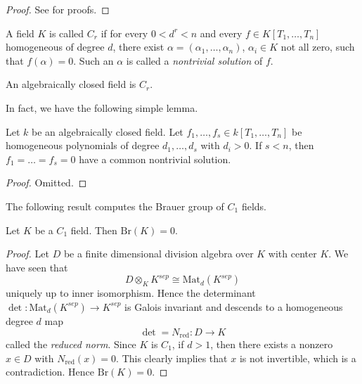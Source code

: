 \begin{proof}
See \cite{SerreGaloisCohomology} for proofs.
\end{proof}


\begin{definition}
\label{definition-Cr}
A field $K$ is called {\it $C_r$}
if for every $0 < d^r < n$ and every $f \in K[T_1,
\ldots, T_n]$ homogeneous of degree $d$, there exist $\alpha = (\alpha_1,
\ldots, \alpha_n)$, $\alpha_i \in K$ not all zero, such that $f(\alpha) = 0$.
Such an $\alpha$ is called a {\it nontrivial solution} of $f$.
\end{definition}

\begin{example}
\label{example-algebraically-closed-field-Cr}
An algebraically closed field is $C_r$.
\end{example}

\noindent
In fact, we have the following simple lemma.

\begin{lemma}
\label{lemma-algebraically-closed-find-solutions}
Let $k$ be an algebraically closed field. Let
$f_1, \ldots, f_s \in k[T_1, \ldots, T_n]$
be homogeneous polynomials of degree $d_1, \ldots, d_s$ with $d_i
> 0$. If $s < n$, then $f_1 = \ldots = f_s = 0$ have a common nontrivial
solution.
\end{lemma}

\begin{proof}
Omitted.
\end{proof}

\noindent
The following result computes the Brauer group of $C_1$ fields.

\begin{theorem}
\label{theorem-C1-brauer-group-zero}
Let $K$ be a $C_1$ field. Then $\text{Br}(K) = 0$.
\end{theorem}

\begin{proof}
Let $D$ be a finite dimensional division algebra over $K$ with center $K$. We
have seen that
$$
D \otimes_K K^{sep} \cong \text{Mat}_d(K^{sep})
$$
uniquely up to inner isomorphism. Hence the determinant $\det :
\text{Mat}_d(K^{sep}) \to K^{sep}$ is Galois invariant and descends to a
homogeneous degree $d$ map
$$
\det = N_\text{red} : D \longrightarrow K
$$
called the {\it reduced norm}. Since $K$ is $C_1$, if $d > 1$, then there
exists a nonzero $x \in D$ with $N_\text{red}(x) = 0$. This clearly implies
that $x$ is not invertible, which is a contradiction. Hence $\text{Br}(K) = 0$.
\end{proof}


